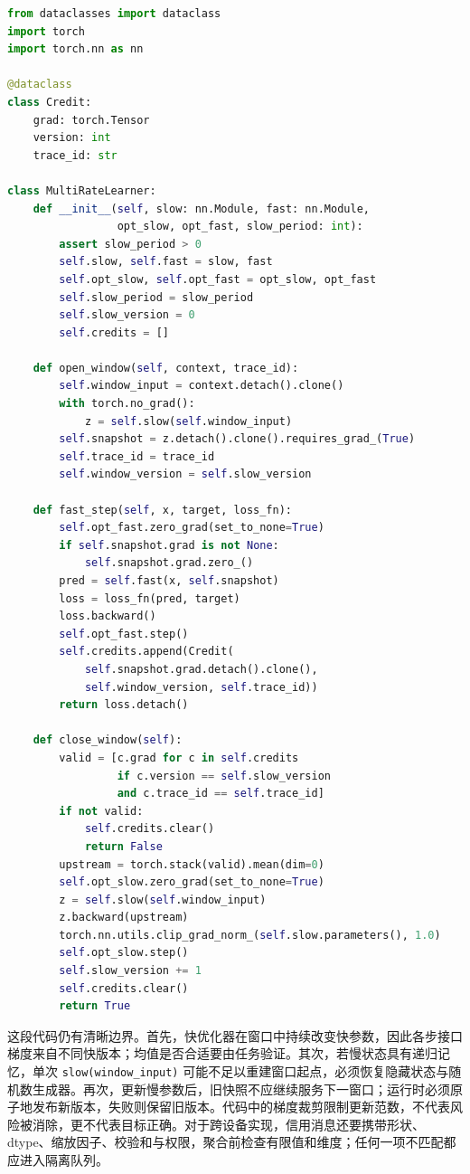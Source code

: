 \begin{lstlisting}[language=Python, caption={带版本检查的多尺度截断信用训练骨架}, label={lst:adiabatic_engine}]
from dataclasses import dataclass
import torch
import torch.nn as nn

@dataclass
class Credit:
    grad: torch.Tensor
    version: int
    trace_id: str

class MultiRateLearner:
    def __init__(self, slow: nn.Module, fast: nn.Module,
                 opt_slow, opt_fast, slow_period: int):
        assert slow_period > 0
        self.slow, self.fast = slow, fast
        self.opt_slow, self.opt_fast = opt_slow, opt_fast
        self.slow_period = slow_period
        self.slow_version = 0
        self.credits = []

    def open_window(self, context, trace_id):
        self.window_input = context.detach().clone()
        with torch.no_grad():
            z = self.slow(self.window_input)
        self.snapshot = z.detach().clone().requires_grad_(True)
        self.trace_id = trace_id
        self.window_version = self.slow_version

    def fast_step(self, x, target, loss_fn):
        self.opt_fast.zero_grad(set_to_none=True)
        if self.snapshot.grad is not None:
            self.snapshot.grad.zero_()
        pred = self.fast(x, self.snapshot)
        loss = loss_fn(pred, target)
        loss.backward()
        self.opt_fast.step()
        self.credits.append(Credit(
            self.snapshot.grad.detach().clone(),
            self.window_version, self.trace_id))
        return loss.detach()

    def close_window(self):
        valid = [c.grad for c in self.credits
                 if c.version == self.slow_version
                 and c.trace_id == self.trace_id]
        if not valid:
            self.credits.clear()
            return False
        upstream = torch.stack(valid).mean(dim=0)
        self.opt_slow.zero_grad(set_to_none=True)
        z = self.slow(self.window_input)
        z.backward(upstream)
        torch.nn.utils.clip_grad_norm_(self.slow.parameters(), 1.0)
        self.opt_slow.step()
        self.slow_version += 1
        self.credits.clear()
        return True
\end{lstlisting}

这段代码仍有清晰边界。首先，快优化器在窗口中持续改变快参数，因此各步接口梯度来自不同快版本；均值是否合适要由任务验证。其次，若慢状态具有递归记忆，单次 \texttt{slow(window\_input)} 可能不足以重建窗口起点，必须恢复隐藏状态与随机数生成器。再次，更新慢参数后，旧快照不应继续服务下一窗口；运行时必须原子地发布新版本，失败则保留旧版本。代码中的梯度裁剪限制更新范数，不代表风险被消除，更不代表目标正确。对于跨设备实现，信用消息还要携带形状、dtype、缩放因子、校验和与权限，聚合前检查有限值和维度；任何一项不匹配都应进入隔离队列。

